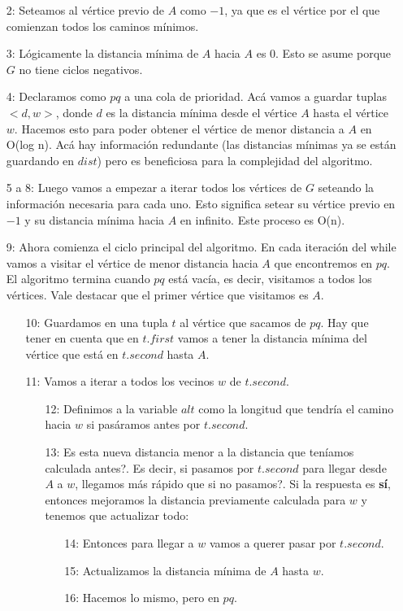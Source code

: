 \begin{enumerate}
\item [2:] Seteamos al v\'ertice previo de $A$ como $-1$, ya que es el v\'ertice por el que comienzan todos los caminos m\'inimos.
\item [3:] L\'ogicamente la distancia m\'inima de $A$ hacia $A$ es 0. Esto se asume porque $G$ no tiene ciclos negativos.
\item [4:] Declaramos como $pq$ a una cola de prioridad. Ac\'a vamos a guardar tuplas $<d, w>$, donde $d$ es la distancia m\'inima desde el v\'ertice $A$ hasta el v\'ertice $w$. Hacemos esto para poder obtener el v\'ertice de menor distancia a $A$ en O(log n). Ac\'a hay informaci\'on redundante (las distancias m\'inimas ya se est\'an guardando en $dist$) pero es beneficiosa para la complejidad del algoritmo.
\item [5 a 8:] Luego vamos a empezar a iterar todos los v\'ertices de $G$ seteando la informaci\'on necesaria para cada uno. Esto significa setear su v\'ertice previo en $-1$ y su distancia m\'inima hacia $A$ en infinito. Este proceso es O(n).
\item [9:] Ahora comienza el ciclo principal del algoritmo. En cada iteraci\'on del while vamos a visitar el v\'ertice de menor distancia hacia $A$ que encontremos en $pq$. El algoritmo termina cuando $pq$ est\'a vac\'ia, es decir, visitamos a todos los v\'ertices. Vale destacar que el primer v\'ertice que visitamos es $A$.
    \begin{enumerate}
    \item [10:] Guardamos en una tupla $t$ al v\'ertice que sacamos de $pq$. Hay que tener en cuenta que en $t.first$ vamos a tener la distancia m\'inima del v\'ertice que est\'a en $t.second$ hasta $A$.
    \item [11:] Vamos a iterar a todos los vecinos $w$ de $t.second$.
        \begin{enumerate}
        \item [12:] Definimos a la variable $alt$ como la longitud que tendr\'ia el camino hacia $w$ si pas\'aramos antes por $t.second$.
        \item [13:] \¿Es esta nueva distancia menor a la distancia que ten\'iamos calculada antes?. Es decir, \¿si pasamos por $t.second$ para llegar desde $A$ a $w$, llegamos m\'as r\'apido que si no pasamos?. Si la respuesta es \textbf{s\'i}, entonces mejoramos la distancia previamente calculada para $w$ y tenemos que actualizar todo:
            \begin{enumerate}
            \item [14:] Entonces para llegar a $w$ vamos a querer pasar por $t.second$.
            \item [15:] Actualizamos la distancia m\'inima de $A$ hasta $w$.
            \item [16:] Hacemos lo mismo, pero en $pq$.
            \end{enumerate}
        \end{enumerate}
    \end{enumerate}
\end{enumerate}

